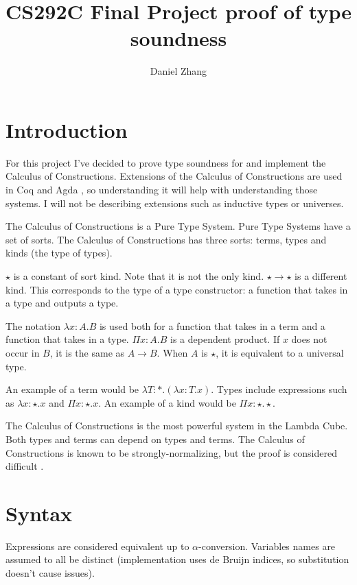 \documentclass{article}
\begin{document}
\title{CS292C Final Project proof of type soundness}
\author{Daniel Zhang}
\maketitle

\section{Introduction}

For this project I've decided to prove type soundness for and implement the Calculus of Constructions. Extensions of the Calculus of Constructions are used in Coq and Agda \cite{Casinghino10}, so understanding it will help with understanding those systems. I will not be describing extensions such as inductive types or universes.

The Calculus of Constructions is a Pure Type System. Pure Type Systems have a set of sorts. The Calculus of Constructions has three sorts: terms, types and kinds (the type of types).

$\star$ is a constant of sort kind. Note that it is not the only kind. $\star\rightarrow\star$ is a different kind. This corresponds to the type of a type constructor: a function that takes in a type and outputs a type.

The notation $\lambda x:A.B$ is used both for a function that takes in a term and a function that takes in a type.
$\Pi x:A.B$ is a dependent product. If $x$ does not occur in $B$, it is the same as $A\rightarrow B$. When $A$ is $\star$, it is equivalent to a universal type. \cite{Jones97}

An example of a term would be $\lambda T:*.(\lambda x:T.x)$. Types include expressions such as $\lambda x:\star.x$ and $\Pi x:\star.x$. An example of a kind would be $\Pi x:\star.\star$.

The Calculus of Constructions is the most powerful system in the Lambda Cube. Both types and terms can depend on types and terms.
The Calculus of Constructions is known to be strongly-normalizing, but the proof is considered difficult \cite{Casinghino10}.

\section{Syntax}

Expressions are considered equivalent up to $\alpha$-conversion.
Variables names are assumed to all be distinct (implementation uses de Bruijn indices, so substitution doesn't cause issues).
\end{document}
